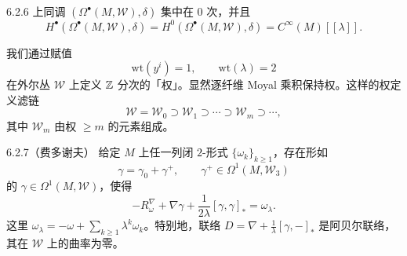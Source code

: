 \begin{lemma}{6.2.6}
  上同调 $(\Omega^\bullet(M,\mathcal{W}),\delta)$ 集中在 $0$ 次，并且
  \[
  H^\bullet(\Omega^\bullet(M,\mathcal{W}),\delta)
  =H^0(\Omega^\bullet(M,\mathcal{W}),\delta)=C^\infty(M)[[\lambda]].
  \]
\end{lemma}

我们通过赋值
\[
\mathrm{wt}(y^i)=1,\qquad \mathrm{wt}(\lambda)=2
\]
在外尔丛 $\mathcal{W}$ 上定义 $\mathbb{Z}$ 分次的「权」。显然逐纤维 Moyal 乘积保持权。这样的权定义滤链
\[
\mathcal{W}=\mathcal{W}_0\supset\mathcal{W}_1\supset\cdots\supset\mathcal{W}_m\supset\cdots,
\]
其中 $\mathcal{W}_m$ 由权 $\ge m$ 的元素组成。

\begin{theorem}{6.2.7（费多谢夫）}
  给定 $M$ 上任一列闭 $2$-形式 $\{\omega_k\}_{k\ge1}$，存在形如
  \[
  \gamma=\gamma_0+\gamma^+,\qquad \gamma^+\in\Omega^1(M,\mathcal{W}_3)
  \]
  的 $\gamma\in\Omega^1(M,\mathcal{W})$，使得
  \[
  -R^\nabla_\omega+\nabla\gamma+\frac{1}{2\lambda}[\gamma,\gamma]_*
  =\omega_\lambda.
  \]
  这里 $\omega_\lambda=-\omega+\sum_{k\ge1}\lambda^k\omega_k$。特别地，联络
  $D=\nabla+\frac1\lambda[\gamma,-]_*$ 是阿贝尔联络，其在 $\mathcal{W}$ 上的曲率为零。
\end{theorem}

